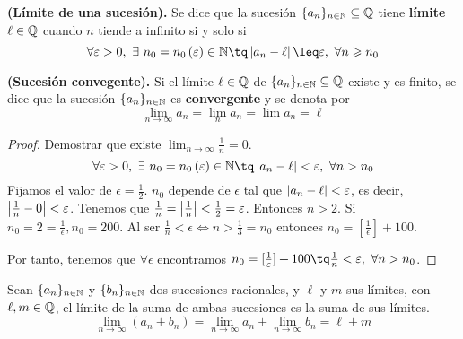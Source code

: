 \begin{defi}
    \textbf{(Límite de una sucesión).} Se dice que la sucesión $\{a_n\}_{n\in\mathbb{N}}\subseteq\mathbb{Q} $ tiene \textbf{límite} $\ell\in\mathbb{Q}$ cuando $n$ tiende a infinito si y solo si
    \begin{equation}
        \forall\epsilon > 0,\ \exists\ n_0 = n_0\left( \epsilon \right)\in\N\tq \abs{a_n - \ell}\leq \epsilon,\ \forall n\geq n_0
    \end{equation}
\end{defi}

\begin{defi}
    \textbf{(Sucesión convegente).} Si el límite $\ell\in\mathbb{Q}$ de $\{a_n\}_{n\in\mathbb{N}}\subseteq\mathbb{Q} $ existe y es finito, se dice que la sucesión $\{a_n\}_{n\in\mathbb{N}} $ es \textbf{convergente} y se denota por
    \begin{equation}
        \lim_{n\to\infty} a_n  = \lim_n a_n = \lim a_n = \ell
    \end{equation}
\end{defi}

\begin{proof}
    Demostrar que existe $\lim_{n\to\infty} \frac{1}{n} = 0$.
    \begin{equation}
        \forall\epsilon > 0,\ \exists\ n_0 = n_0\left( \epsilon \right) \in\N\tq \abs{a_n - \ell} < \epsilon,\ \forall n > n_0
    \end{equation}
    Fijamos el valor de $\epsilon = \frac{1}{2}$. $n_0$ depende de $\epsilon$ tal que $\left\vert a_n - \ell \right\vert < \varepsilon$, es decir, $\left\vert \frac{1}{n} - 0 \right\vert < \varepsilon$. Tenemos que $\frac{1}{n}=\left\vert \frac{1}{n} \right\vert < \frac{1}{2} = \varepsilon$. Entonces $n > 2$. Si $n_0 = 2 = \frac{1}{\epsilon}, n_0 = 200$. Al ser $\frac{1}{n} < \epsilon\iff n > \frac{1}{3} = n_0$ entonces $n_0 = [\frac{1}{\epsilon}] + 100$.

        Por tanto, tenemos que $\forall\epsilon$ encontramos $n_0 = [\frac{1}{\epsilon}] + 100 \tq \frac{1}{n} < \epsilon,\ \forall n > n_0$.
\end{proof}

\begin{prop}
    Sean $\{a_n\}_{n\in\mathbb{N}} $ y $\{b_n\}_{n\in\mathbb{N}} $ dos sucesiones racionales, y $\ell$ y $m$ sus límites, con $\ell, m\in\mathbb{Q}$, el límite de la suma de ambas sucesiones es la suma de sus límites.
    \begin{equation}
        \lim_{n\to\infty}\left( a_n + b_n \right) = \lim_{n\to\infty}a_n + \lim_{n\to\infty}b_n = \ell + m
    \end{equation}
\end{prop}

